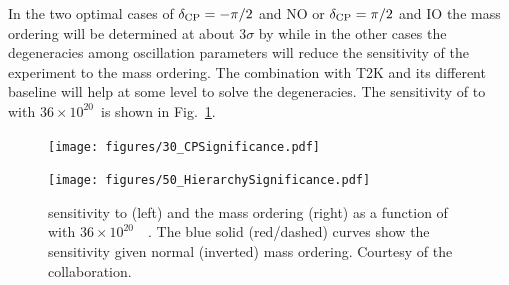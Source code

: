 In the two optimal cases of $\delta_{\mathrm{CP}}=-\pi/2$ and NO or $\delta_{\mathrm{CP}}=\pi/2$ and IO the mass ordering will be determined at about $3\sigma$ by \nova while in the other cases the degeneracies among oscillation parameters will reduce the sensitivity of the experiment to the mass ordering. The combination with T2K and its different baseline will help at some level to solve the degeneracies. The sensitivity of \nova to \dcp with  $36\times10^{20}$~\pot is shown in Fig.~\ref{fig:novasensidcp}.



\begin{figure}[htbp]
\begin{minipage}[c]{.46\linewidth}
   	      \texttt{[image: figures/30\_CPSignificance.pdf]}
   \end{minipage} \hfill
   \begin{minipage}{.46\linewidth}
      \texttt{[image: figures/50\_HierarchySignificance.pdf]}
   \end{minipage}
    \caption{
\nova sensitivity to \dcp (left) and the mass ordering (right) as a function of \dcp with $36\times10^{20}$~\pot~\cite{messier2016}. The blue solid (red/dashed) curves show the sensitivity given normal (inverted) mass ordering. Courtesy of the \nova collaboration.
}
\label{fig:novasensidcp}
\end{figure}

%
%







